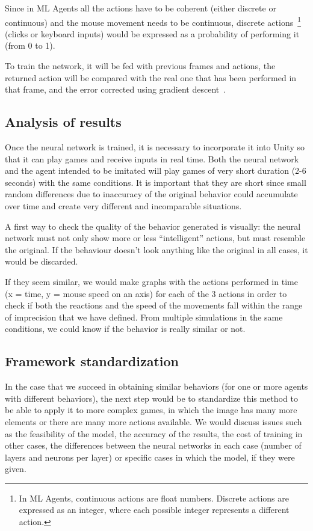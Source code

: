Since in ML Agents all the actions have to be coherent (either discrete or continuous) and the mouse movement needs to be continuous, discrete actions~\footnote{In ML Agents, continuous actions are float numbers. Discrete actions are expressed as an integer, where each possible integer represents a different action.} (clicks or keyboard inputs) would be expressed as a probability of performing it (from 0 to 1).

To train the network, it will be fed with previous frames and actions, the returned action will be compared with the real one that has been performed in that frame, and the error corrected using gradient descent~\cite{mlagents}.


\subsection{Analysis of results}

Once the neural network is trained, it is necessary to incorporate it into Unity so that it can play games and receive inputs in real time. Both the neural network and the agent intended to be imitated will play games of very short duration (2-6 seconds) with the same conditions. It is important that they are short since small random differences due to inaccuracy of the original behavior could accumulate over time and create very different and incomparable situations.

A first way to check the quality of the behavior generated is visually: the neural network must not only show more or less “intelligent” actions, but must resemble the original. If the behaviour doesn’t look anything like the original in all cases, it would be discarded.

If they seem similar, we would make graphs with the actions performed in time (x = time, y = mouse speed on an axis) for each of the 3 actions in order to check if both the reactions and the speed of the movements fall within the range of imprecision that we have defined. From multiple simulations in the same conditions, we could know if the behavior is really similar or not.

\subsection{Framework standardization}

In the case that we succeed in obtaining similar behaviors (for one or more agents with different behaviors), the next step would be to standardize this method to be able to apply it to more complex games, in which the image has many more elements or there are many more actions available. We would discuss issues such as the feasibility of the model, the accuracy of the results, the cost of training in other cases, the differences between the neural networks in each case (number of layers and neurons per layer) or specific cases in which the model, if they were given.

